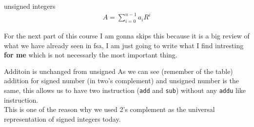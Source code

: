 \begin{parag}{unsigned integers}
    \begin{align*} A = \sum_{i = 0}^{n - 1} a_iR^i \end{align*}
\end{parag}
For the next part of this course I am gonna skips this because it is a big review of what we have already seen in fsa, I am just going to write what I find intresting \textbf{for me} which is not necessarly the most important thing.
\begin{parag}{Additoin is unchanged from unsigned}
    As we can see (remember of the table) addition for signed number (in two's complement) and unsigned number is the same, this allows us to have two instruction (\texttt{add} and \texttt{sub}) without any \texttt{addu} like instruction.\\
	This is one of the reason why we used 2's complement as the universal representation of signed integers today.
\end{parag}



